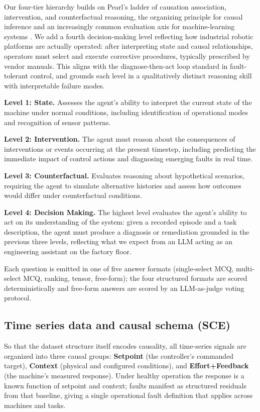 Our four-tier hierarchy builds on Pearl's ladder of causation association, intervention, and counterfactual reasoning, the organizing principle for causal inference and an increasingly common evaluation axis for machine-learning systems \cite{pearl2009causality,peters2017elements,jin2023cladder,pawlowski2020deep_scm,peyrard2020ladder}. We add a fourth decision-making level reflecting how industrial robotic platforms are actually operated: after interpreting state and causal relationships, operators must select and execute corrective procedures, typically prescribed by vendor manuals. This aligns with the diagnose-then-act loop standard in fault-tolerant control, and grounds each level in a qualitatively distinct reasoning skill with interpretable failure modes.

\textbf{Level 1: State.} Assesses the agent's ability to interpret the current state of the machine under normal conditions, including identification of operational modes and recognition of sensor patterns.

\textbf{Level 2: Intervention.} The agent must reason about the consequences of interventions or events occurring at the present timestep, including predicting the immediate impact of control actions and diagnosing emerging faults in real time.

\textbf{Level 3: Counterfactual.} Evaluates reasoning about hypothetical scenarios, requiring the agent to simulate alternative histories and assess how outcomes would differ under counterfactual conditions.

\textbf{Level 4: Decision Making.} The highest level evaluates the agent's ability to act on its understanding of the system: given a recorded episode and a task description, the agent must produce a diagnosis or remediation grounded in the previous three levels, reflecting what we expect from an LLM acting as an engineering assistant on the factory floor.

Each question is emitted in one of five answer formats (single-select MCQ, multi-select MCQ, ranking, tensor, free-form); the four structured formats are scored deterministically and free-form answers are scored by an LLM-as-judge voting protocol.

\subsection{Time series data and causal schema (SCE)}
\label{sec:sce}

So that the dataset structure itself encodes causality, all time-series signals are organized into three causal groups: \textbf{Setpoint} (the controller's commanded target), \textbf{Context} (physical and configured conditions), and \textbf{Effort+Feedback} (the machine's measured response). Under healthy operation the response is a known function of setpoint and context; faults manifest as structured residuals from that baseline, giving a single operational fault definition that applies across machines and tasks.

